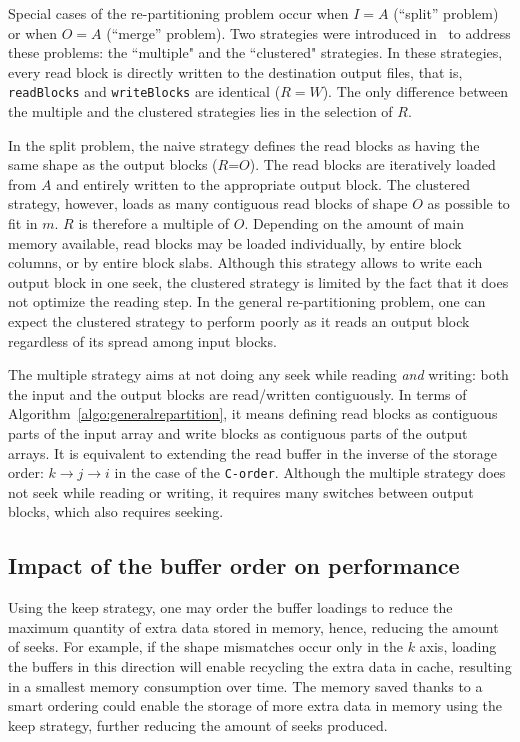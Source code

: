 \documentclass[sigconf, nonacm]{acmart}
\begin{document}
Special cases of the re-partitioning problem occur when $I=A$ (``split'' problem)
or when $O=A$ (``merge'' problem). Two strategies were introduced
in~\cite{seqalgorithms} to address these problems: the ``multiple" and the
``clustered" strategies. In these strategies, every read block is directly written to the
destination output files, that is, \texttt{readBlocks} and \texttt{writeBlocks} are identical ($R=W$).
The only difference between the multiple and the clustered strategies lies in
the selection of $R$.

In the split problem, the naive
strategy defines the read blocks as having the same shape as the output blocks
($R$=$O$). The read blocks are iteratively loaded from $A$ and entirely written
to the appropriate output block.
The clustered strategy, however, loads as
many contiguous read blocks of shape $O$ as possible to fit in $m$.
$R$ is therefore a multiple of $O$.
Depending on the amount of main memory available, read blocks may be loaded
individually, by entire block columns, or by entire block slabs.
Although this strategy allows to write each output block in one seek, the clustered strategy is limited by the fact
that it does not optimize the reading step.
In the general re-partitioning problem, one can expect the clustered strategy to
perform poorly as it reads an output block regardless of its spread among input blocks.

The multiple strategy
aims at not doing any seek while reading \textit{and} writing:
both the input and the output blocks are read/written contiguously. In
terms of Algorithm~\ref{algo:generalrepartition}, it means defining read blocks as
contiguous parts of the input array and write blocks as contiguous parts of
the output arrays. It is equivalent to extending the read buffer in the inverse of
the storage order: $k \rightarrow j \rightarrow i$ in the case
of the \texttt{C-order}. Although the multiple strategy does not seek while reading or writing, it
requires many switches between output blocks, which also requires seeking.

\subsection{Impact of the buffer order on performance}
Using the keep strategy, one may order the buffer loadings to reduce the maximum
quantity of extra data stored in memory, hence, reducing the amount of seeks.
For example, if the shape mismatches occur only in the $k$ axis, loading the
buffers in this direction will enable recycling the extra data in cache,
resulting in a smallest memory consumption over time.
The memory saved thanks to a smart
ordering could enable the storage of more extra data in memory using the
keep strategy, further reducing the amount of seeks produced.
\end{document}
